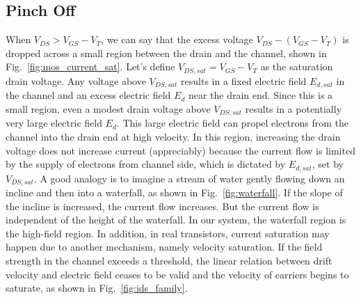 \subsection{Pinch Off}
When $V_{DS} > V_{GS}-V_T$, we can say that the excess voltage $V_{DS} - (V_{GS}-V_T)$ is dropped across a small region between the drain and the channel, shown in Fig.~\ref{fig:mos_current_sat}.  Let's define $V_{DS,sat} = V_{GS}-V_T$ as the saturation drain voltage.  Any voltage above $V_{DS,sat}$ results in a fixed electric field $E_{d,sat}$ in the channel and an excess electric field $E_{d}$ near the drain end.  Since this is a small region, even a modest drain voltage above $V_{DS,sat}$ results in a potentially very large electric field $E_d$.  This large electric field can propel electrons from the channel into the drain end at high velocity.  In this region, increasing the drain voltage does not increase current (appreciably) because the current flow is limited by the supply of electrons from channel side, which is dictated by $E_{d,sat}$, set by $V_{DS,sat}$.  A good analogy is to imagine a stream of water gently flowing down an incline and then into a waterfall, as shown in Fig.~\ref{fig:waterfall}.  If the slope of the incline is increased, the current flow increases.  But the current flow is independent of the height of the waterfall.  In our system, the waterfall region is the high-field region.  
In addition, in real transistors, current saturation may happen due to another mechanism, namely velocity saturation. If the field strength in the channel exceeds a threshold, the linear relation between drift velocity and electric field ceases to be valid and the velocity of carriers begins to saturate, as shown in Fig.~\ref{fig:ids_family}.
